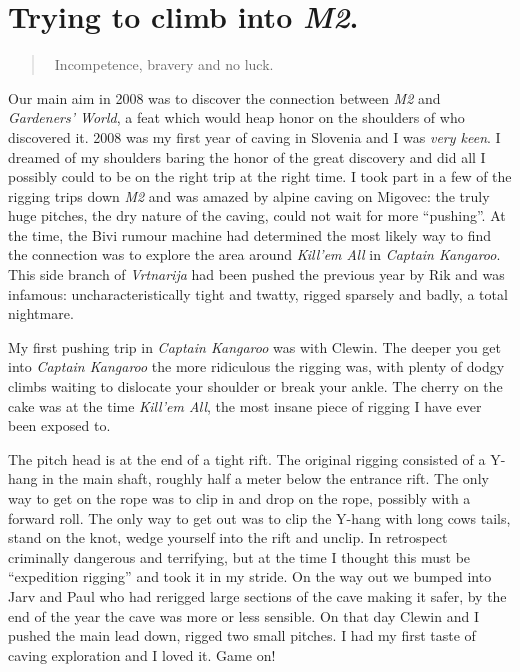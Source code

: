 \section{\texorpdfstring{Trying to climb into
\emph{M2}.}{Trying to climb into M2.}}

\begin{quote} Incompetence, bravery and no luck. \end{quote}

Our main aim in 2008 was to discover the connection between \emph{M2}
and \emph{Gardeners' World}, a feat which would heap honor on the
shoulders of who discovered it. 2008 was my first year of caving in
Slovenia and I was \textit{very keen}. I dreamed of my shoulders baring
the honor of the great discovery and did all I possibly could to be on
the right trip at the right time. I took part in a few of the rigging
trips down \emph{M2} and was amazed by alpine caving on Migovec: the
truly huge pitches, the dry nature of the caving, could not wait for
more ``pushing''. At the time, the Bivi rumour machine had determined
the most likely way to find the connection was to explore the area
around \emph{Kill'em All} in \emph{Captain Kangaroo}. This side branch
of \emph{Vrtnarija} had been pushed the previous year by Rik and was
infamous: uncharacteristically tight and twatty, rigged sparsely and
badly, a total nightmare.

My first pushing trip in \emph{Captain Kangaroo} was with Clewin. The
deeper you get into \emph{Captain Kangaroo} the more ridiculous the
rigging was, with plenty of dodgy climbs waiting to dislocate your
shoulder or break your ankle. The cherry on the cake was at the time
\emph{Kill'em All}, the most insane piece of rigging I have ever been
exposed to.

The pitch head is at the end of a tight rift. The original rigging
consisted of a Y-hang in the main shaft, roughly half a meter below the
entrance rift. The only way to get on the rope was to clip in and drop
on the rope, possibly with a forward roll. The only way to get out was
to clip the Y-hang with long cows tails, stand on the knot, wedge
yourself into the rift and unclip. In retrospect criminally dangerous
and terrifying, but at the time I thought this must be ``expedition
rigging'' and took it in my stride. On the way out we bumped into Jarv
and Paul who had rerigged large sections of the cave making it safer, by
the end of the year the cave was more or less sensible. On that day
Clewin and I pushed the main lead down, rigged two small pitches. I had
my first taste of caving exploration and I loved it. Game on!

